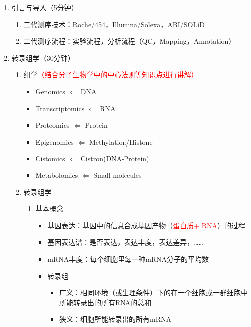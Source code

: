 \documentclass{TIJMUjiaoanLL}
\begin{document}
\begin{enumerate}
  \item 引言与导入（5分钟）
    \begin{enumerate}
      \item 二代测序技术：Roche/454，Illumina/Solexa，ABI/SOLiD
      \item 二代测序流程：实验流程，分析流程（QC，Mapping，Annotation）
    \end{enumerate}

  \item 转录组学（30分钟）
    \begin{enumerate}
      \item 组学\textcolor{red}{（结合分子生物学中的中心法则等知识点进行讲解）}
        \begin{itemize}
          \item Genomics $\Leftarrow$ DNA
          \item Transcriptomics $\Leftarrow$ RNA
          \item Proteomics $\Leftarrow$ Protein
          \item Epigenomics $\Leftarrow$ Methylation/Histone
          \item Cistomics $\Leftarrow$ Cistron(DNA-Protein)
          \item Metabolomics $\Leftarrow$ Small molecules
        \end{itemize}
      \item 转录组学
        \begin{enumerate}
          \item 基本概念
            \begin{itemize}
              \item 基因表达：基因中的信息合成基因产物（\textcolor{red}{蛋白质+ RNA}）的过程
              \item 基因表达谱：是否表达，表达丰度，表达差异，……
              \item mRNA丰度：每个细胞里每一种mRNA分子的平均数
              \item 转录组
                \begin{itemize}
                  \item 广义：相同环境（或生理条件）下的在一个细胞或一群细胞中所能转录出的所有RNA的总和
                  \item 狭义：细胞所能转录出的所有mRNA
                \end{itemize}
            \end{itemize}

\end{enumerate}
\end{enumerate}
\end{enumerate}
\end{document}
